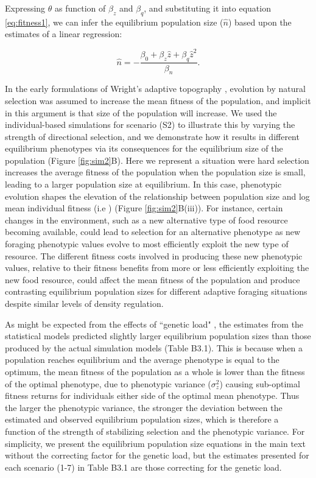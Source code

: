 \documentclass{article}
\begin{document}
\noindent Expressing $\theta$ as function of $\beta_{z}$ and $\beta_{q}$, and substituting it into equation \ref{eq:fitness1}, we can infer the equilibrium population size ($\hat{n}$) based upon the estimates of a linear regression:

\begin{equation}\label{eq:equilibrium1}
\hat{n}=-\frac{\beta_{0}+ \beta_{z}\hat{z} + \beta_{q}\hat{z}^2}{\beta_n}. 
\end{equation}

In the early formulations of Wright's adaptive topography \citep{Wright1931}, evolution by natural selection was assumed to increase the mean fitness of the population, and implicit in this argument is that size of the population will increase. We used the individual-based simulations for scenario (S2) to illustrate this by varying the strength of directional selection, and we demonstrate how it results in different equilibrium phenotypes via its consequences for the equilibrium size of the population (Figure \ref{fig:sim2}B). Here we represent a situation were hard selection increases the average fitness of the population when the population size is small, leading to a larger population size at equilibrium. In this case, phenotypic evolution shapes the elevation of the relationship between population size and log mean individual fitness (i.e ) (Figure \ref{fig:sim2}B(iii)).  For instance, certain changes in the environment, such as a new alternative type of food resource becoming available, could lead to selection for an alternative phenotype as new foraging phenotypic values evolve to most efficiently exploit the new type of resource. The different fitness costs involved in producing these new phenotypic values, relative to their fitness benefits from more or less efficiently exploiting the new food resource, could affect the mean fitness of the population and produce contrasting equilibrium population sizes for different adaptive foraging situations despite similar levels of density regulation.

As might be expected from the effects of “genetic load" \citep{Lande1996}, the estimates from the statistical models predicted slightly larger equilibrium population sizes than those produced by the actual simulation models  (Table B3.1). This is because when a population reaches equilibrium and the average phenotype is equal to the optimum, the mean fitness of the population as a whole is lower than the fitness of the optimal phenotype, due to phenotypic variance ($\sigma^2_z$) causing sub-optimal fitness returns for individuals either side of the optimal mean phenotype. Thus the larger the phenotypic variance, the stronger the deviation between the estimated and observed equilibrium population sizes, which is therefore a function of the strength of stabilizing selection and the phenotypic variance. For simplicity, we present the equilibrium population size equations in the main text without the correcting factor for the genetic load, but the estimates presented for each scenario (1-7) in Table B3.1 are those correcting for the genetic load.  
 
\end{document}
